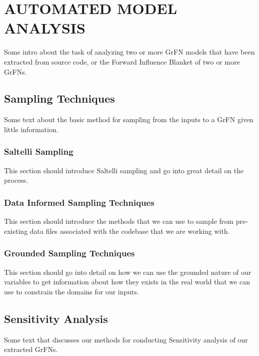 \chapter{AUTOMATED MODEL ANALYSIS\label{chapter:analysis}}

Some intro about the task of analyzing two or more GrFN models that have been extracted from source code, or the Forward Influence Blanket of two or more GrFNs.

\section{Sampling Techniques\label{sec:samp_overview}}

Some text about the basic method for sampling from the inputs to a GrFN given little information.

\subsection{Saltelli Sampling\label{sec:saltelli_samp}}

This section should introduce Saltelli sampling and go into great detail on the process.

\subsection{Data Informed Sampling Techniques\label{sec:data_samp}}

This section should introduce the methods that we can use to sample from pre-existing data files associated with the codebase that we are working with.

\subsection{Grounded Sampling Techniques\label{sec:grounded_samp}}

This section should go into detail on how we can use the grounded nature of our variables to get information about how they exists in the real world that we can use to constrain the domains for our inputs.

\section{Sensitivity Analysis\label{sec:sensitivity_overview}}

Some text that discusses our methods for conducting Sensitivity analysis of our extracted GrFNs.

